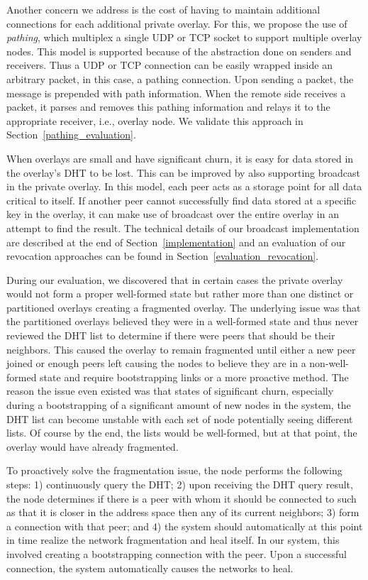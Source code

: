 \documentclass[conference]{IEEEtran}
\begin{document}
Another concern we address is the cost of having to maintain additional
connections for each additional private overlay.  For this, we propose the use of
{\em pathing}, which multiplex a single UDP or TCP socket to support multiple
overlay nodes.  This model is supported because of the abstraction done on
senders and receivers.  Thus a UDP or TCP connection can be easily wrapped 
inside an arbitrary packet, in this case, a pathing connection.  Upon sending
a packet, the message is prepended with path information.  When the remote side
receives a packet, it parses and removes this pathing information and relays it
to the appropriate receiver, i.e., overlay node.  We validate this approach in
Section~\ref{pathing_evaluation}.

When overlays are small and have significant churn, it is easy for data stored
in the overlay's DHT to be lost.  This can be improved by also supporting
broadcast in the private overlay.  In this model, each peer acts as a
storage point for all data critical to itself.  If another peer cannot
successfully find data stored at a specific key in the overlay, it can make
use of broadcast over the entire overlay in an attempt to find
the result.  The technical details of our broadcast implementation are described
at the end of Section~\ref{implementation} and an evaluation of our revocation
approaches can be found in Section~\ref{evaluation_revocation}.

During our evaluation, we discovered that in certain cases the private overlay
would not form a proper well-formed state but rather more than one distinct or
partitioned overlays creating a fragmented overlay.  The underlying issue was that the
partitioned overlays believed they were in a well-formed state and thus never
reviewed the DHT list to determine if there were peers that should be their
neighbors.  This caused the overlay to remain fragmented until either a new
peer joined or enough peers left causing the nodes to believe they are in a
non-well-formed state and require bootstrapping links or a more proactive 
method.  The reason the issue even existed was that states of significant churn,
especially during a bootstrapping of a significant amount of new nodes in the
system, the DHT list can become unstable with each set of node potentially
seeing different lists.  Of course by the end, the lists would be well-formed,
but at that point, the overlay would have already fragmented.

To proactively solve the fragmentation issue, the node performs the following
steps: 1) continuously query the DHT;  2) upon receiving the DHT query result,
the node determines if there is a peer with whom it should be connected to
such as that it is closer in the address space then any of its current neighbors;
3) form a connection with that peer; and 4) the system should automatically at
this point in time realize the network fragmentation and heal itself.  In our
system, this involved creating a bootstrapping connection with the peer.  Upon
a successful connection, the system automatically causes the networks to heal.
\end{document}

